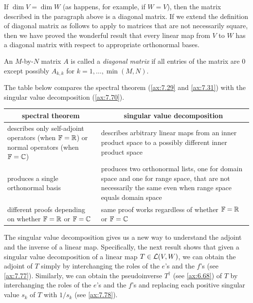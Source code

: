 If $\dim V=\dim W$ (as happens, for example, if $W=V$), then the matrix
described in the paragraph above is a diagonal matrix. If we extend the
definition of diagonal matrix as follows to apply to matrices that are not
necessarily square, then we have proved the wonderful result that every linear
map from $V$ to $W$ has a diagonal matrix with respect to appropriate
orthonormal bases.

\begin{definition}\label{ax:7.74}
An $M$-by-$N$ matrix $A$ is called a \emph{diagonal matrix} if all entries of
the matrix are $0$ except possibly $A_{k,k}$ for $k=1,\dots,\min(M,N)$.
\end{definition}

The table below compares the spectral theorem (\ref{ax:7.29} and
\ref{ax:7.31}) with the singular value decomposition (\ref{ax:7.70}).

\begin{center}\small
\begin{tabular}{|p{.44\linewidth}|p{.44\linewidth}|}
\hline
\multicolumn{1}{|c|}{\textbf{spectral theorem}} &
\multicolumn{1}{c|}{\textbf{singular value decomposition}}\\
\hline
describes only self-adjoint operators (when $\mathbb{F}=\mathbb{R}$) or normal operators (when
$\mathbb{F}=\mathbb{C}$) &
describes arbitrary linear maps from an inner product space to a possibly
different inner product space\\
\hline
produces a single orthonormal basis &
produces two orthonormal lists, one for domain space and one for range space,
that are not necessarily the same even when range space equals domain space\\
\hline
different proofs depending on whether $\mathbb{F}=\mathbb{R}$ or $\mathbb{F}=\mathbb{C}$ &
same proof works regardless of whether $\mathbb{F}=\mathbb{R}$ or $\mathbb{F}=\mathbb{C}$\\
\hline
\end{tabular}
\end{center}

The singular value decomposition gives us a new way to understand the adjoint
and the inverse of a linear map. Specifically, the next result shows that given
a singular value decomposition of a linear map $T\in\mathcal{L}(V,W)$, we can obtain
the adjoint of $T$ simply by interchanging the roles of the $e$'s and the
$f$'s (see \ref{ax:7.77}). Similarly, we can obtain the pseudoinverse
$T^\dagger$ (see \ref{ax:6.68}) of $T$ by interchanging the roles of the $e$'s
and the $f$'s and replacing each positive singular value $s_k$ of $T$ with
$1/s_k$ (see \ref{ax:7.78}).


